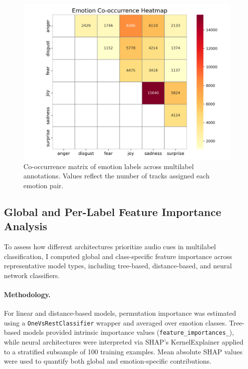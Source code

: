\documentclass{article}
\begin{document}
\begin{figure}[H]
\centering
\includegraphics[width=\textwidth]{Graphics/Emotion_Co_Heatmap.pdf}
\caption{Co-occurrence matrix of emotion labels across multilabel annotations. Values reflect the number of tracks assigned each emotion pair.}
\label{fig:emotion_cooccur}
\end{figure}

\subsection{Global and Per-Label Feature Importance Analysis}

To assess how different architectures prioritize audio cues in multilabel classification, I computed global and class-specific feature importance across representative model types, including tree-based, distance-based, and neural network classifiers.

\paragraph{Methodology.} For linear and distance-based models, permutation importance was estimated using a \texttt{OneVsRestClassifier} wrapper and averaged over emotion classes. Tree-based models provided intrinsic importance values (\texttt{feature\_importances\_}), while neural architectures were interpreted via SHAP’s KernelExplainer applied to a stratified subsample of 100 training examples. Mean absolute SHAP values were used to quantify both global and emotion-specific contributions.
\end{document}

